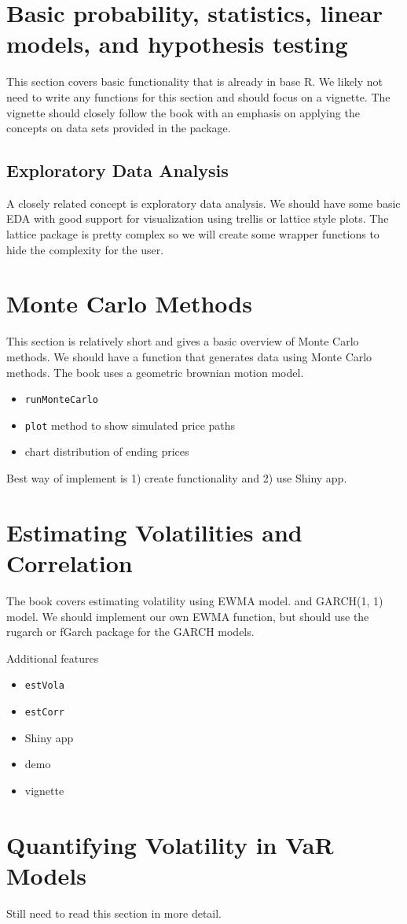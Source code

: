 \documentclass[12pt]{amsart}
\begin{document}
\section{Basic probability, statistics, linear models, and hypothesis testing}
This section covers basic functionality that is already in base R. We likely not need to write any functions for this section and should focus on a vignette. The vignette should closely follow the book with an emphasis on applying the concepts on data sets provided in the package.

\subsection{Exploratory Data Analysis}
A closely related concept is exploratory data analysis. We should have some basic EDA with good support for visualization using trellis or lattice style plots. The lattice package is pretty complex so we will create some wrapper functions to hide the complexity for the user.

\section{Monte Carlo Methods}
This section is relatively short and gives a basic overview of Monte Carlo methods. We should have a function that generates data using Monte Carlo methods. The book uses a geometric brownian motion model.

\begin{itemize}
\item \verb"runMonteCarlo"
\item \verb"plot" method to show simulated price paths
\item chart distribution of ending prices
\end{itemize}
Best way of implement is 1) create functionality and 2) use Shiny app.


\section{Estimating Volatilities and Correlation}
The book covers estimating volatility using EWMA model. and GARCH(1, 1) model. We should implement our own EWMA function, but should use the rugarch or fGarch package for the GARCH models.

Additional features
\begin{itemize}
\item \verb"estVola"
\item \verb"estCorr"
\item Shiny app
\item demo
\item vignette
\end{itemize}

\section{Quantifying Volatility in VaR Models}
Still need to read this section in more detail.
\end{document}
